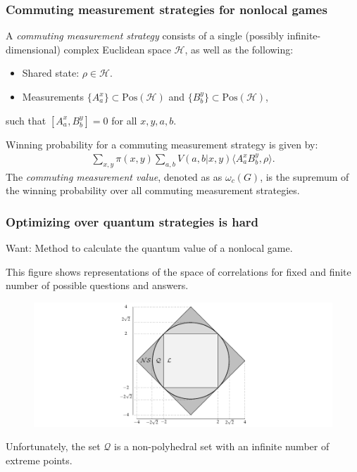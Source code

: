 \documentclass{beamer}
\newcommand{\bigip}[2]{\bigl\langle #1, #2 \bigr\rangle}
\def\H{\mathcal{H}}
\def\Q{\mathcal{Q}}
\newcommand{\setft}[1]{\mathrm{#1}}
\newcommand{\Pos}{\setft{Pos}}
\begin{document}
\begin{frame}
	\frametitle{Commuting measurement strategies for nonlocal games}
	A \emph{commuting measurement strategy} consists of a single (possibly infinite-dimensional) complex Euclidean space $\H$, as well as the following:
	\begin{itemize}
		\item Shared state: $\rho \in \H$.
		\item Measurements $\{A^x_a\} \subset \Pos(\H)$ and $\{B_b^y\} \subset \Pos(\H)$,
	\end{itemize}
	such that $\left[A_a^x, B_b^y\right] = 0$ for all $x,y,a,b$. 
	\vspace{5mm}
	
	Winning probability for a commuting measurement strategy is given by:
	\begin{align*}
		\sum_{x,y} \pi(x,y) \sum_{a,b} V(a,b|x,y) \bigip{A_a^x B_b^y}{\rho}.
	\end{align*}
	The \emph{commuting measurement value}, denoted as as $\omega_c(G)$, is the supremum of the winning probability over all commuting measurement strategies. 
\end{frame}

\begin{frame}
	\frametitle{Optimizing over quantum strategies is hard}
	\begin{center}
		{Want: Method to calculate the quantum value of a nonlocal game.}
	\end{center}	
	\vspace{2mm}
	This figure shows representations of the space of correlations for fixed and finite number of possible questions and answers.
	\begin{figure}[!htpb] \label{fig:extended-nonlocal-game}
	\begin{center}
		\includegraphics[scale=0.65]{figures/chsh_polytope.pdf}
	\end{center}
\end{figure}	
	Unfortunately, the set $\Q$ is a non-polyhedral set with an infinite number of extreme points. 
\end{frame}
\end{document}
